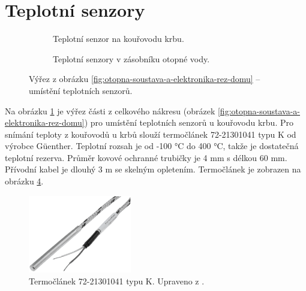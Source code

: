 \section{Teplotní senzory}
\label{sec:teplotni-senzory}

\begin{figure}[H]
\centering
\begin{subfigure}{.5\textwidth}
    \centering
    
    \caption{Teplotní senzor na kouřovodu krbu.}
    \label{fig:vyrez-teplotni-senzory-krb}
\end{subfigure}%
\begin{subfigure}{.5\textwidth}
   	\centering
   	
     \caption{Teplotní senzory v zásobníku otopné vody.}
    \label{fig:vyrez-teplotni-senzory-zasobnik-otopne-vody}
\end{subfigure}%
\caption[Výřez pro umístění teplotních senzorů.]{Výřez z obrázku \ref{fig:otopna-soustava-a-elektronika-rez-domu} – umístění teplotních senzorů.}
\end{figure}

Na obrázku \ref{fig:vyrez-teplotni-senzory-krb} je výřez části z celkového nákresu (obrázek \ref{fig:otopna-soustava-a-elektronika-rez-domu}) pro umístění teplotních senzorů u kouřovodu krbu. Pro snímání teploty z kouřovodů u krbů slouží termočlánek 72-21301041 \cite{termoclanek-k} typu K od výrobce Güenther. Teplotní rozsah je od -100 °C do 400 °C, takže je dostatečná teplotní rezerva. Průměr kovové ochranné trubičky je 4 mm s délkou 60 mm. Přívodní kabel je dlouhý 3 m se skelným opletením. Termočlánek je zobrazen na obrázku \ref{fig:termoclanek-72-21301041-k}.

\begin{figure}[H]
    \centering
    \includegraphics[width=0.4\textwidth]{images/termoclanek-72-21301041-k.png}
    \caption[Termočlánek 72-21301041 typu K.]{Termočlánek 72-21301041 typu K. Upraveno z \cite{termoclanek-k}.}
    \label{fig:termoclanek-72-21301041-k}
\end{figure}

